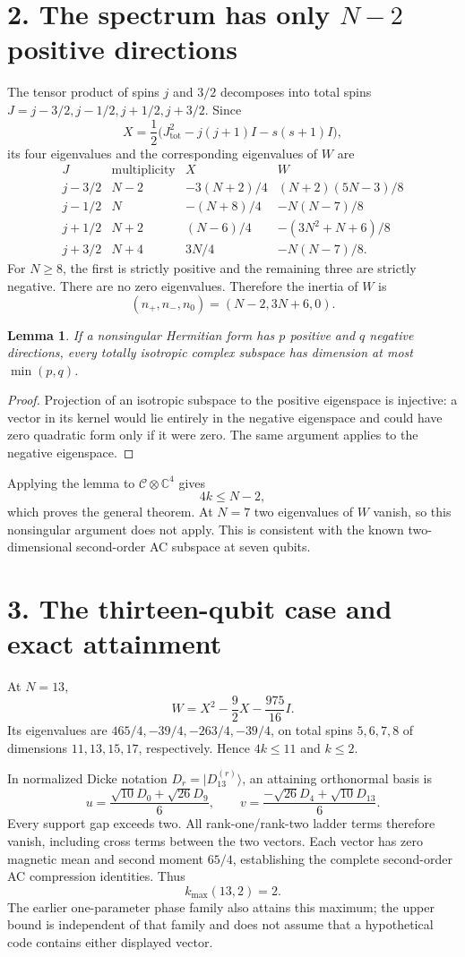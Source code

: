 \documentclass[11pt]{article}
\newtheorem{lemma}{Lemma}
\begin{document}
\section*{2. The spectrum has only $N-2$ positive directions}
The tensor product of spins $j$ and $3/2$ decomposes into total spins
$J=j-3/2,j-1/2,j+1/2,j+3/2$. Since
\[
 X=\frac12\bigl(J_{\mathrm{tot}}^2-j(j+1)I-s(s+1)I\bigr),
\]
its four eigenvalues and the corresponding eigenvalues of $W$ are
\[
\begin{array}{c|c|c|c}
J&\text{multiplicity}&X&W\\\hline
j-3/2&N-2&-3(N+2)/4&(N+2)(5N-3)/8\\
j-1/2&N&-(N+8)/4&-N(N-7)/8\\
j+1/2&N+2&(N-6)/4&-(3N^2+N+6)/8\\
j+3/2&N+4&3N/4&-N(N-7)/8.
\end{array}
\]
For $N\ge8$, the first is strictly positive and the remaining three are
strictly negative. There are no zero eigenvalues. Therefore the inertia
of $W$ is
\[
 (n_+,n_-,n_0)=(N-2,3N+6,0).
\]

\begin{lemma}
If a nonsingular Hermitian form has $p$ positive and $q$ negative
directions, every totally isotropic complex subspace has dimension at
most $\min(p,q)$.
\end{lemma}
\begin{proof}
Projection of an isotropic subspace to the positive eigenspace is
injective: a vector in its kernel would lie entirely in the negative
eigenspace and could have zero quadratic form only if it were zero.
The same argument applies to the negative eigenspace.
\end{proof}
Applying the lemma to $\mathcal C\otimes\mathbb C^4$ gives
\[
 4k\le N-2,
\]
which proves the general theorem. At $N=7$ two eigenvalues of $W$ vanish,
so this nonsingular argument does not apply. This is consistent with the
known two-dimensional second-order AC subspace at seven qubits.

\section*{3. The thirteen-qubit case and exact attainment}
At $N=13$,
\[
 W=X^2-\frac92X-\frac{975}{16}I.
\]
Its eigenvalues are $465/4,-39/4,-263/4,-39/4$, on total spins
$5,6,7,8$ of dimensions $11,13,15,17$, respectively. Hence $4k\le11$
and $k\le2$.

In normalized Dicke notation $D_r=|D_{13}^{(r)}\rangle$, an attaining
orthonormal basis is
\[
 u=\frac{\sqrt{10}D_0+\sqrt{26}D_9}{6},\qquad
 v=\frac{-\sqrt{26}D_4+\sqrt{10}D_{13}}{6}.
\]
Every support gap exceeds two. All rank-one/rank-two ladder terms
therefore vanish, including cross terms between the two vectors. Each
vector has zero magnetic mean and second moment $65/4$, establishing
the complete second-order AC compression identities. Thus
\[
 \boxed{k_{\max}(13,2)=2.}
\]
The earlier one-parameter phase family also attains this maximum; the
upper bound is independent of that family and does not assume that a
hypothetical code contains either displayed vector.
\end{document}
